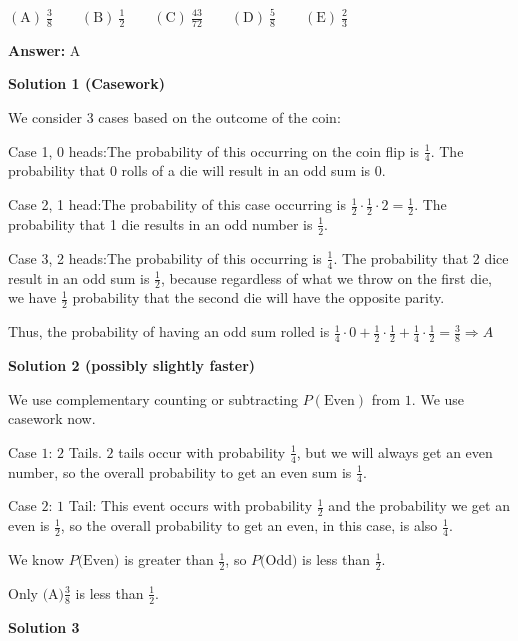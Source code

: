 \begin{enumerate}
 $\mathrm{(A)}\ {{{\frac{3} {8}}}} \qquad \mathrm{(B)}\ {{{\frac{1} {2}}}} \qquad \mathrm{(C)}\ {{{\frac{43} {72}}}} \qquad \mathrm{(D)}\ {{{\frac{5} {8}}}} \qquad \mathrm{(E)}\ {{{\frac{2} {3}}}}$

 \textbf{Answer: }A



\textbf{Solution 1 (Casework)}

We consider 3 cases based on the outcome of the coin:

 Case 1, 0 heads:The probability of this occurring on the coin flip is $\frac{1} {4}$. The probability that 0 rolls of a die will result in an odd sum is $0$. 

 Case 2, 1 head:The probability of this case occurring is $\frac{1} {2} \cdot \frac {1} {2} \cdot 2 = \frac {1} {2}.$ The probability that 1 die results in an odd number is $\frac{1} {2}$.

 Case 3, 2 heads:The probability of this occurring is $\frac{1} {4}$. The probability that 2 dice result in an odd sum is $\frac{1} {2}$, because regardless of what we throw on the first die, we have $\frac{1} {2}$ probability that the second die will have the opposite parity.

 Thus, the probability of having an odd sum rolled is $\frac{1} {4} \cdot 0 + \frac{1} {2} \cdot \frac{1} {2} + \frac{1} {4} \cdot \frac{1} {2}=\frac{3} {8}\Rightarrow \boxed{A}$




\textbf{Solution 2 (possibly slightly faster)}

We use complementary counting or subtracting $P(\text{Even})$ from $1$. We use casework now.

 Case $1$: $2$ Tails. $2$ tails occur with probability $\frac{1}{4}$, but we will always get an even number, so the overall probability to get an even sum is $\frac{1}{4}$.

 Case $2$: $1$ Tail: This event occurs with probability $\frac{1}{2}$ and the probability we get an even is $\frac{1}{2}$, so the overall probability to get an even, in this case, is also $\frac{1}{4}$.

 We know $P\text{(Even)}$ is greater than $\frac{1}{2}$, so $P\text{(Odd)}$ is less than $\frac{1}{2}$.

 Only $\boxed{\text{(A)}\frac{3}{8}}$ is less than $\frac{1}{2}$.

 



\textbf{Solution 3}


\end{enumerate}
